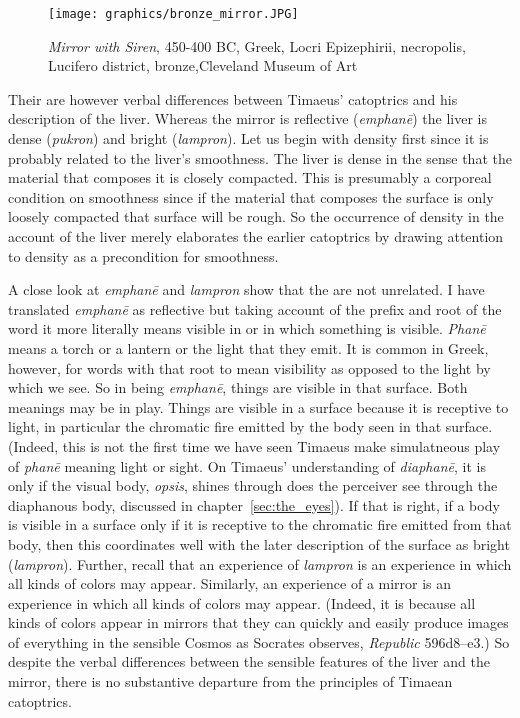 \begin{figure}[htbp]
     \centering
         \texttt{[image: graphics/bronze\_mirror.JPG]}
     \caption{\emph{Mirror with Siren}, 450-400 BC, Greek, Locri Epizephirii, necropolis, Lucifero district, bronze,Cleveland Museum of Art}
     \label{bronze_mirror}
\end{figure}

Their are however verbal differences between Timaeus' catoptrics and his description of the liver. Whereas the mirror is reflective (\emph{emphanē}) the liver is dense (\emph{pukron}) and bright (\emph{lampron}). Let us begin with density first since it is probably related to the liver's smoothness. The liver is dense in the sense that the material that composes it is closely compacted. This is presumably a corporeal condition on smoothness since if the material that composes the surface is only loosely compacted that surface will be rough. So the occurrence of density in the account of the liver merely elaborates the earlier catoptrics by drawing attention to density as a precondition for smoothness. 

A close look at \emph{emphanē} and \emph{lampron} show that the are not unrelated. I have translated \emph{emphanē} as reflective but taking account of the prefix and root of the word it more literally means visible in or in which something is visible. \emph{Phanē} means a torch or a lantern or the light that they emit. It is common in Greek, however, for words with that root to mean visibility as opposed to the light by which we see. So in being \emph{emphanē}, things are visible in that surface. Both meanings may be in play. Things are visible in a surface because it is receptive to light, in particular the chromatic fire emitted by the body seen in that surface. (Indeed, this is not the first time we have seen Timaeus make simulatneous play of \emph{phanē} meaning light or sight. On Timaeus' understanding of \emph{diaphanē}, it is only if the visual body, \emph{opsis}, shines through does the perceiver see through the diaphanous body, discussed in chapter~\ref{sec:the_eyes}). If that is right, if a body is visible in a surface only if it is receptive to the chromatic fire emitted from that body, then this coordinates well with the later description of the surface as bright (\emph{lampron}). Further, recall that an experience of \emph{lampron} is an experience in which all kinds of colors may appear. Similarly, an experience of a mirror is an experience in which all kinds of colors may appear. (Indeed, it is because all kinds of colors appear in mirrors that they can quickly and easily produce images of everything in the sensible Cosmos as Socrates observes, \emph{Republic} 596d8--e3.) So despite the verbal differences between the sensible features of the liver and the mirror, there is no substantive departure from the principles of Timaean catoptrics.


